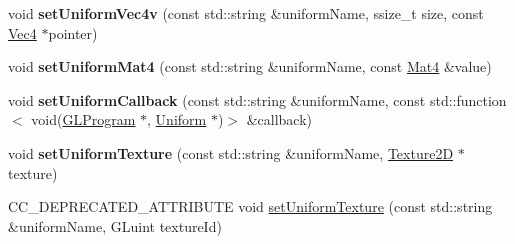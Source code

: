 \begin{DoxyCompactItemize}
void {\bfseries set\+Uniform\+Vec4v} (const std\+::string \&uniform\+Name, ssize\+\_\+t size, const \hyperlink{classVec4}{Vec4} $\ast$pointer)
\item 
\mbox{\label{classGLProgramState_ab6866f8be98c5689ab449fa1d8d63abf}} 
void {\bfseries set\+Uniform\+Mat4} (const std\+::string \&uniform\+Name, const \hyperlink{classMat4}{Mat4} \&value)
\item 
\mbox{\label{classGLProgramState_ab68ab4203f7d3c72daeeef21cd677abc}} 
void {\bfseries set\+Uniform\+Callback} (const std\+::string \&uniform\+Name, const std\+::function$<$ void(\hyperlink{classGLProgram}{G\+L\+Program} $\ast$, \hyperlink{structUniform}{Uniform} $\ast$)$>$ \&callback)
\item 
\mbox{\label{classGLProgramState_ab5dd4c017912c8207bd2d9a087c27c5d}} 
void {\bfseries set\+Uniform\+Texture} (const std\+::string \&uniform\+Name, \hyperlink{classTexture2D}{Texture2D} $\ast$texture)
\item 
C\+C\+\_\+\+D\+E\+P\+R\+E\+C\+A\+T\+E\+D\+\_\+\+A\+T\+T\+R\+I\+B\+U\+TE void \hyperlink{classGLProgramState_a222f78e49e5e4531a986a691f81394d1}{set\+Uniform\+Texture} (const std\+::string \&uniform\+Name, G\+Luint texture\+Id)
\end{DoxyCompactItemize}

